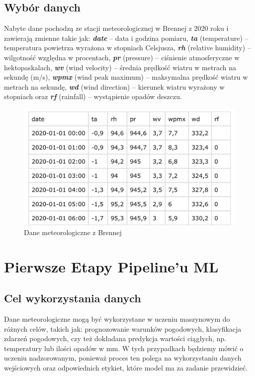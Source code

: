 \documentclass[10pt,a4paper]{article}
\begin{document}
\subsection*{Wybór danych}
Nabyte dane pochodzą ze stacji meteorologicznej w Brennej z 2020 roku i zawierają zmienne takie jak: 
\textbf{\textit{date}} – data i godzina pomiaru, 
\textbf{\textit{ta}} (temperature) – temperatura powietrza wyrażona w stopniach Celsjusza, 
\textbf{\textit{rh}} (relative humidity) – wilgotność względna w procentach, 
\textbf{\textit{pr}} (pressure) – ciśnienie atmosferyczne w hektopaskalach, 
\textbf{\textit{wv}} (wind velocity) – średnia prędkość wiatru w metrach na sekundę (m/s), 
\textbf{\textit{wpmx}} (wind peak maximum) – maksymalna prędkość wiatru w metrach na sekundę, 
\textbf{\textit{wd}} (wind direction) – kierunek wiatru wyrażony w stopniach oraz 
\textbf{\textit{rf}} (rainfall) – wystąpienie opadów deszczu.
\begin{figure}[h]
	\centering
	\includegraphics[scale=0.4]{Image.jpg}
	\caption{Dane meteorologiczne z Brennej}
	\label{fig:my_label}
\end{figure}

\section{Pierwsze Etapy Pipeline'u ML}
\subsection*{Cel wykorzystania danych}
Dane meteorologiczne mogą być wykorzystane w uczeniu maszynowym do różnych celów, takich jak: prognozowanie warunków pogodowych, klasyfikacja zdarzeń pogodowych, czy też dokładana predykcja wartości ciągłych, np. temperatury lub ilości opadów w mm. W tych przypadkach będziemy mówić o uczeniu nadzorowanym, ponieważ proces ten polega na wykorzystaniu danych wejściowych oraz odpowiednich etykiet, które model ma za zadanie przewidzieć.
\end{document}
